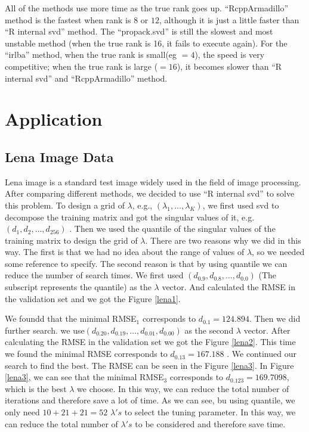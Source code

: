 \documentclass[12pt]{article}
\begin{document}
All of the methods use more time as the true rank goes up. “RcppArmadillo” method is the fastest when rank is $8$ or $12$, although it is just a little faster than “R internal svd” method. The “propack.svd” is still the slowest and most unstable method (when the true rank is 16, it fails to execute again). For the “irlba” method, when the true rank is small(eg $=4$), the speed is very competitive;  when the true rank is large ($=16$), it becomes slower than “R internal svd” and “RcppArmadillo” method.

\section{Application}

\subsection{Lena Image Data}
Lena image is a standard test image widely used in the field of image processing.
After comparing different methods, we decided to use “R internal svd” to solve this problem.  To design a grid of $\lambda$, e.g., $(\lambda_{1}, \ldots, \lambda_{K})$, we first used svd to decompose the training matrix and got the singular values of it, e.g. $(d_{1}, d_{2}, \ldots, d_{256})$ . Then we used the quantile of the singular values of the training matrix to design the grid of $\lambda$. There are two reasons why we did in this way. The first is that we had no idea about the range of values of $\lambda$, so we needed some reference to specify. The second reason is that by using quantile we can reduce the number of search times. We first used $(d_{0.9}, d_{0.8}, \ldots, d_{0.0})$ (The subscript represents the quantile) as the $\lambda$ vector. And calculated the RMSE in the validation set and we got the Figure \ref{lena1}. 

We foundd that the minimal RMSE$_{1}$ corresponds to $d_{0.1}=124.894$. Then we did further search. we use$(d_{0.20}, d_{0.19}, \ldots, d_{0.01}, d_{0.00})$ as the second $\lambda$ vector. After calculating the RMSE in the validation set we got the Figure \ref{lena2}. This time we found the minimal RMSE corresponds to $d_{0.13}=167.188$ . We continued our search to find the best. The RMSE can be seen in the Figure \ref{lena3}. In Figure \ref{lena3}, we can see that the minimal RMSE$_{3}$ corresponds to  $d_{0.123}=169.7098$,  which is the best $\lambda$ we choose. In this way, we can reduce the total number of iterations and therefore save a lot of time. As we can see, bu using quantile, we only need $10+21+21 = 52$ $\lambda' s$ to select the tuning parameter. In this way, we can reduce the total number of $\lambda' s$ to be considered and therefore save time.
\end{document}
